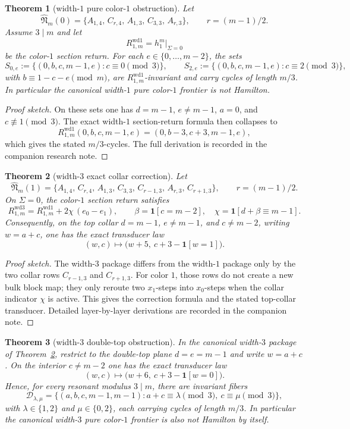 \documentclass[11pt]{article}
\newtheorem{theorem}{Theorem}[section]
\begin{document}
\begin{theorem}[width-$1$ pure color-$1$ obstruction]
\label{thm:wd1-obstruction}
Let
\[
\widehat{\mathfrak N}_m(0)=
\{A_{1,4},\,C_{r,4},\,A_{1,3},\,C_{3,3},\,A_{r,3}\},
\qquad r=(m-1)/2.
\]
Assume $3\mid m$ and let
\[
R^{\mathrm{wd1}}_{1,m}=h_1^m\big|_{\Sigma=0}
\]
be the color-$1$ section return.
For each $e\in\{0,\dots,m-2\}$, the sets
\[
S_{0,e}:=\{(0,b,c,m-1,e): c\equiv 0 \pmod 3\},
\qquad
S_{2,e}:=\{(0,b,c,m-1,e): c\equiv 2 \pmod 3\},
\]
with $b\equiv 1-c-e\pmod m$, are $R^{\mathrm{wd1}}_{1,m}$-invariant and carry
cycles of length $m/3$.
In particular the canonical width-$1$ pure color-$1$ frontier is not Hamilton.
\end{theorem}

\begin{proof}[Proof sketch]
On these sets one has $d=m-1$, $e\neq m-1$, $a=0$, and $c\not\equiv1\pmod3$.
The exact width-$1$ section-return formula then collapses to
\[
R^{\mathrm{wd1}}_{1,m}(0,b,c,m-1,e)=(0,b-3,c+3,m-1,e),
\]
which gives the stated $m/3$-cycles.
The full derivation is recorded in the companion research note.
\end{proof}

\begin{theorem}[width-$3$ exact collar correction]
\label{thm:wd3-collar-correction}
Let
\[
\widehat{\mathfrak N}_m(1)=
\{A_{1,4},\,C_{r,4},\,A_{1,3},\,C_{3,3},\,C_{r-1,3},\,A_{r,3},\,C_{r+1,3}\},
\qquad r=(m-1)/2.
\]
On $\Sigma=0$, the color-$1$ section return satisfies
\[
R^{\mathrm{wd3}}_{1,m}=R^{\mathrm{wd1}}_{1,m}+2\chi\,(e_0-e_1),
\qquad
\beta=\mathbf 1[c=m-2],\quad
\chi=\mathbf 1[d+\beta\equiv m-1].
\]
Consequently, on the top collar $d=m-1$, $e\neq m-1$, and $c\neq m-2$, writing
$w=a+c$, one has the exact transducer law
\[
(w,c)\longmapsto \bigl(w+5,\ c+3-\mathbf 1[w=1]\bigr).
\]
\end{theorem}

\begin{proof}[Proof sketch]
The width-$3$ package differs from the width-$1$ package only by the two collar
rows $C_{r-1,3}$ and $C_{r+1,3}$.
For color $1$, those rows do not create a new bulk block map; they only reroute
two $x_1$-steps into $x_0$-steps when the collar indicator $\chi$ is active.
This gives the correction formula and the stated top-collar transducer.
Detailed layer-by-layer derivations are recorded in the companion note.
\end{proof}

\begin{theorem}[width-$3$ double-top obstruction]
\label{thm:wd3-doubletop-obstruction}
In the canonical width-$3$ package of Theorem~\ref{thm:wd3-collar-correction},
restrict to the double-top plane $d=e=m-1$ and write $w=a+c$.
On the interior $c\neq m-2$ one has the exact transducer law
\[
(w,c)\longmapsto \bigl(w+6,\ c+3-\mathbf 1[w=0]\bigr).
\]
Hence, for every resonant modulus $3\mid m$, there are invariant fibers
\[
\mathcal D_{\lambda,\mu}
=
\{(a,b,c,m-1,m-1): a+c\equiv \lambda\!\!\pmod3,\ c\equiv \mu\!\!\pmod3\},
\]
with $\lambda\in\{1,2\}$ and $\mu\in\{0,2\}$, each carrying cycles of length
$m/3$.
In particular the canonical width-$3$ pure color-$1$ frontier is also not
Hamilton by itself.
\end{theorem}
\end{document}
